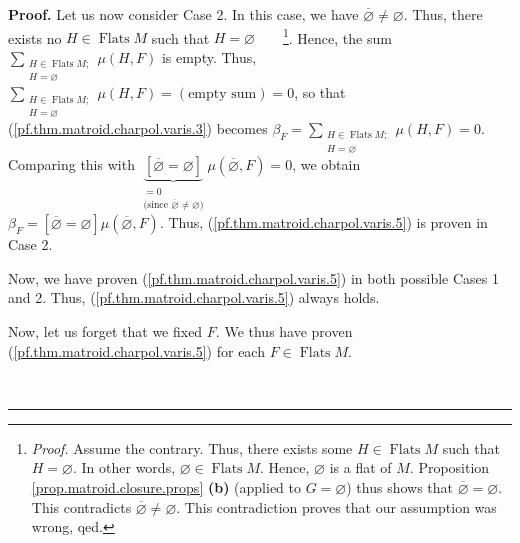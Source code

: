 \documentclass[numbers=enddot,12pt,final,onecolumn,notitlepage]{scrartcl}%
\theoremstyle{definition}
\newenvironment{proof}[1][Proof]{\noindent\textbf{#1.} }{\ \rule{0.5em}{0.5em}}
\let\sumnonlimits\sum
\renewcommand{\sum}{\sumnonlimits\limits}
\begin{document}
\begin{proof}
Let us now consider Case 2. In this case, we have $\overline{\varnothing}%
\neq\varnothing$. Thus, there exists no $H\in\operatorname*{Flats}M$ such that
$H=\varnothing$\ \ \ \ \footnote{\textit{Proof.} Assume the contrary. Thus,
there exists some $H\in\operatorname*{Flats}M$ such that $H=\varnothing$. In
other words, $\varnothing\in\operatorname*{Flats}M$. Hence, $\varnothing$ is a
flat of $M$. Proposition \ref{prop.matroid.closure.props} \textbf{(b)}
(applied to $G=\varnothing$) thus shows that $\overline{\varnothing
}=\varnothing$. This contradicts $\overline{\varnothing}\neq\varnothing$. This
contradiction proves that our assumption was wrong, qed.}. Hence, the sum
$\sum_{\substack{H\in\operatorname*{Flats}M;\\H=\varnothing}}\mu\left(
H,F\right)  $ is empty. Thus, $\sum_{\substack{H\in\operatorname*{Flats}%
M;\\H=\varnothing}}\mu\left(  H,F\right)  =\left(  \text{empty sum}\right)
=0$, so that (\ref{pf.thm.matroid.charpol.varis.3}) becomes $\beta_{F}%
=\sum_{\substack{H\in\operatorname*{Flats}M;\\H=\varnothing}}\mu\left(
H,F\right)  =0$. Comparing this with $\underbrace{\left[  \overline
{\varnothing}=\varnothing\right]  }_{\substack{=0\\\text{(since }%
\overline{\varnothing}\neq\varnothing\text{)}}}\mu\left(  \overline
{\varnothing},F\right)  =0$, we obtain $\beta_{F}=\left[  \overline
{\varnothing}=\varnothing\right]  \mu\left(  \overline{\varnothing},F\right)
$. Thus, (\ref{pf.thm.matroid.charpol.varis.5}) is proven in Case 2.

Now, we have proven (\ref{pf.thm.matroid.charpol.varis.5}) in both possible
Cases 1 and 2. Thus, (\ref{pf.thm.matroid.charpol.varis.5}) always holds.

Now, let us forget that we fixed $F$. We thus have proven
(\ref{pf.thm.matroid.charpol.varis.5}) for each $F\in\operatorname*{Flats}M$.


\end{proof}
\end{document}
